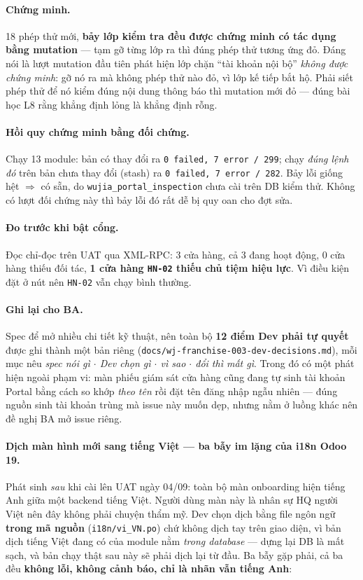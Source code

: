 \paragraph{Chứng minh.} 18 phép thử mới, \textbf{bảy lớp kiểm tra đều được chứng minh có tác
dụng bằng mutation} --- tạm gỡ từng lớp ra thì đúng phép thử tương ứng đỏ. Đáng nói là lượt
mutation đầu tiên phát hiện lớp chặn ``tài khoản nội bộ'' \emph{không được chứng minh}: gỡ nó
ra mà không phép thử nào đỏ, vì lớp kế tiếp bắt hộ. Phải siết phép thử để nó kiểm đúng nội
dung thông báo thì mutation mới đỏ --- đúng bài học L8 rằng khẳng định lỏng là khẳng định
rỗng.

\paragraph{Hồi quy chứng minh bằng đối chứng.} Chạy 13 module: bản có thay đổi ra
\texttt{0 failed, 7 error / 299}; chạy \emph{đúng lệnh đó} trên bản chưa thay đổi (stash) ra
\texttt{0 failed, 7 error / 282}. Bảy lỗi giống hệt $\Rightarrow$ có sẵn, do
\texttt{wujia\_portal\_inspection} chưa cài trên DB kiểm thử. Không có lượt đối chứng này thì
bảy lỗi đó rất dễ bị quy oan cho đợt sửa.

\paragraph{Đo trước khi bật cổng.} Đọc chỉ-đọc trên UAT qua XML-RPC: 3 cửa hàng, cả 3 đang
hoạt động, 0 cửa hàng thiếu đối tác, \textbf{1 cửa hàng \texttt{HN-02} thiếu chủ tiệm hiệu
lực}. Vì điều kiện đặt ở nút nên \texttt{HN-02} vẫn chạy bình thường.

\paragraph{Ghi lại cho BA.} Spec để mở nhiều chi tiết kỹ thuật, nên toàn bộ \textbf{12 điểm
Dev phải tự quyết} được ghi thành một bản riêng
(\texttt{docs/wj-franchise-003-dev-decisions.md}), mỗi mục nêu \emph{spec nói gì $\cdot$ Dev
chọn gì $\cdot$ vì sao $\cdot$ đổi thì mất gì}. Trong đó có một phát hiện ngoài phạm vi:
màn phiếu giám sát cửa hàng cũng đang tự sinh tài khoản Portal bằng cách so khớp \emph{theo
tên} rồi đặt tên đăng nhập ngẫu nhiên --- đúng nguồn sinh tài khoản trùng mà issue này muốn
dẹp, nhưng nằm ở luồng khác nên đề nghị BA mở issue riêng.

\paragraph{Dịch màn hình mới sang tiếng Việt --- ba bẫy im lặng của i18n Odoo 19.}
Phát sinh \emph{sau} khi cài lên UAT ngày 04/09: toàn bộ màn onboarding hiện tiếng Anh giữa một
backend tiếng Việt. Người dùng màn này là nhân sự HQ người Việt nên đây không phải chuyện thẩm
mỹ. Dev chọn dịch bằng file ngôn ngữ \textbf{trong mã nguồn} (\texttt{i18n/vi\_VN.po}) chứ không
dịch tay trên giao diện, vì bản dịch tiếng Việt đang có của module nằm \emph{trong database} ---
dựng lại DB là mất sạch, và bản chạy thật sau này sẽ phải dịch lại từ đầu. Ba bẫy gặp phải, cả
ba đều \textbf{không lỗi, không cảnh báo, chỉ là nhãn vẫn tiếng Anh}:

